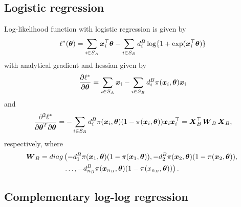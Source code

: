 \documentclass[
  letterpaper,
  DIV=11,
  numbers=noendperiod]{scrreprt}
\begin{document}
\subsection{Logistic regression}\label{logistic-regression}

Log-likelihood function with logistic regression is given by \[
\ell^{*}(\boldsymbol{\theta}) = \sum_{i \in S_A}\boldsymbol{x}_{i}^{\top}\boldsymbol{\theta} - \sum_{i \in S_B}d_{i}^{B}\log\{1 + \exp(\boldsymbol{x}_{i}^{\top}\boldsymbol{\theta})\}
\] with analytical gradient and hessian given by \[
\frac{\partial \ell^*}{\partial\boldsymbol{\theta}} = \sum_{i \in S_{A}}\boldsymbol{x}_{i} - \sum_{i \in S_{B}}d_{i}^{B}\pi(\boldsymbol{x}_{i}, \boldsymbol{\theta})\boldsymbol{x}_{i}
\] and \[
    \frac{\partial^{2} \ell^{*}}{\partial\boldsymbol{\theta}^{T} \partial\boldsymbol{\theta}} =- \sum_{i \in S_B}d_i^B\pi(\boldsymbol{x}_i,\boldsymbol{\theta})(1 - \pi(\boldsymbol{x}_i,\boldsymbol{\theta}))\boldsymbol{x}_i\boldsymbol{x}_i^{\top} = \boldsymbol{X}_B^{\top}\operatorname{\boldsymbol{W}}_{B}\boldsymbol{X}_B,
\] respectively, where \[
\begin{align*}
    \operatorname{\boldsymbol{W}}_{B} =
    diag & \left(-d_1^B\pi(\boldsymbol{x}_{1},\boldsymbol{\theta})(1 - \pi(\boldsymbol{x}_{1},\boldsymbol{\theta})), -d_2^B\pi(\boldsymbol{x}_{2},\boldsymbol{\theta})(1 - \pi(\boldsymbol{x}_{2},\boldsymbol{\theta})), \right. \\
     & \left. \ldots, -d_{n_{B}}^{B}\pi(\boldsymbol{x}_{n_{B}},\boldsymbol{\theta})(1 - \pi(x_{n_{B}},\boldsymbol{\theta}))\right).
\end{align*}
\]

\subsection{Complementary log-log
regression}\label{complementary-log-log-regression}
\end{document}
